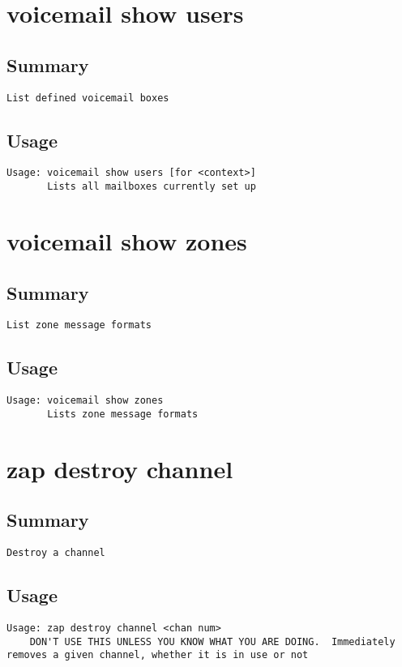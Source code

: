 \section{voicemail show users}
\subsection{Summary}
\begin{verbatim}
List defined voicemail boxes
\end{verbatim}
\subsection{Usage}
\begin{verbatim}
Usage: voicemail show users [for <context>]
       Lists all mailboxes currently set up

\end{verbatim}


\section{voicemail show zones}
\subsection{Summary}
\begin{verbatim}
List zone message formats
\end{verbatim}
\subsection{Usage}
\begin{verbatim}
Usage: voicemail show zones
       Lists zone message formats

\end{verbatim}


\section{zap destroy channel}
\subsection{Summary}
\begin{verbatim}
Destroy a channel
\end{verbatim}
\subsection{Usage}
\begin{verbatim}
Usage: zap destroy channel <chan num>
	DON'T USE THIS UNLESS YOU KNOW WHAT YOU ARE DOING.  Immediately removes a given channel, whether it is in use or not

\end{verbatim}


